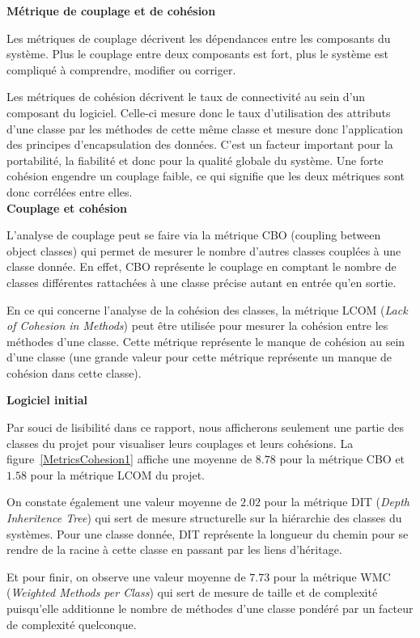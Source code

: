 \documentclass[12pt, openany]{report}
\begin{document}
\newpage

\textbf{\large{Métrique de couplage et de cohésion}}



Les métriques de couplage décrivent les dépendances entre les composants du système. Plus le couplage entre deux composants est fort, plus le système est compliqué à comprendre, modifier ou corriger.


Les métriques de cohésion décrivent le taux de connectivité au sein d’un composant du
logiciel. Celle-ci mesure donc le taux d’utilisation des attributs d’une classe par les méthodes de cette même classe et mesure donc l’application des principes d’encapsulation des données. C’est un facteur important pour la portabilité, la fiabilité et donc pour la qualité globale du système. Une forte cohésion engendre un couplage faible, ce qui signifie que les deux métriques sont donc corrélées entre elles.\\

\textbf{Couplage et cohésion}


L'analyse de couplage peut se faire via la métrique CBO (coupling between object classes) qui permet de mesurer le nombre d'autres classes couplées à une classe donnée. En effet, CBO représente le couplage en comptant le nombre de classes différentes rattachées à une classe précise autant en entrée qu'en sortie.

En ce qui concerne l'analyse de la cohésion des classes, la métrique LCOM (\textit{Lack of Cohesion in Methods}) peut être utilisée pour mesurer la cohésion entre les méthodes d'une classe. Cette métrique représente le manque de cohésion au sein d'une classe (une grande valeur pour cette métrique représente un manque de cohésion dans cette classe).

\textbf{Logiciel initial}

Par souci de lisibilité dans ce rapport, nous afficherons seulement une partie des classes du projet pour visualiser leurs couplages et leurs cohésions. La figure~\ref{MetricsCohesion1} affiche une moyenne de $8.78$ pour la métrique CBO et $1.58$ pour la métrique LCOM du projet. 


On constate également une valeur moyenne de $2.02$ pour la métrique DIT (\textit{Depth Inheritence Tree}) qui sert de mesure structurelle sur la hiérarchie des classes du systèmes. Pour une classe donnée, DIT représente la longueur du chemin pour se rendre de la racine à cette classe en passant par les liens d'héritage.

Et pour finir, on observe une valeur moyenne de $7.73$ pour la métrique WMC (\textit{Weighted Methods per Class}) qui sert de mesure de taille et de complexité puisqu'elle additionne le nombre de méthodes d'une classe pondéré par un facteur de complexité quelconque.
\end{document}
